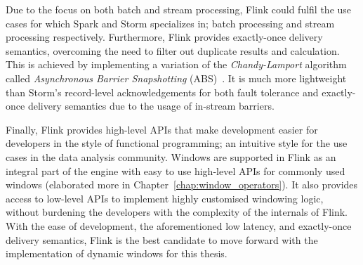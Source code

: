 Due to the focus on both batch and stream processing, Flink could fulfil the use cases for which 
Spark and Storm specializes in; batch processing and stream processing respectively. Furthermore, 
Flink provides exactly-once delivery semantics, overcoming the need to filter out duplicate 
results and calculation. This is achieved by implementing a variation of the \emph{Chandy-Lamport} algorithm
called \emph{Asynchronous Barrier Snapshotting} (ABS)~\cite{asynchronous_barrier}.
It is much more lightweight than Storm's record-level 
acknowledgements for both fault tolerance and exactly-once delivery semantics
due to the usage of in-stream barriers.  

Finally, Flink provides high-level APIs that make development easier for developers in 
the style of functional programming; an intuitive style for the use cases in the data analysis community. 
Windows are supported in Flink as an integral part of the engine with easy to use high-level APIs for 
commonly used windows (elaborated more in Chapter~\ref{chap:window_operators}).  
It also provides access to low-level APIs to implement highly customised windowing logic, without burdening 
the developers with the complexity of the internals of Flink. 
With the ease of development, the aforementioned low latency, and exactly-once delivery semantics, 
Flink is the best candidate to move forward with the implementation of dynamic windows for this thesis. 
